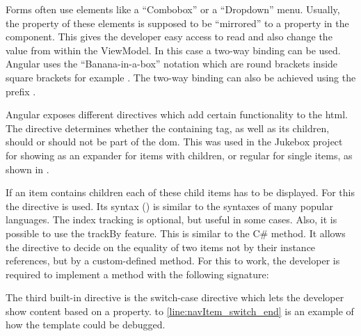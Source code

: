 Forms often use elements like a \enquote{Combobox} or a \enquote{Dropdown} menu. Usually, the  property of these elements is supposed to be \enquote{mirrored} to a property in the component. This gives the developer easy access to read and also change the value from within the ViewModel. In this case a two-way binding can be used. Angular uses the \enquote{Banana-in-a-box} notation which are round brackets inside square brackets for example . The two-way binding can also be achieved using the  prefix \zB {}. \cite{angularTemplateSyntax}


Angular exposes different directives which add certain functionality to the \gls{html}. The  directive determines whether the containing tag, as well as its children, should or should not be part of the \gls{dom}. This was used in the Jukebox project for showing  as an expander for items with children, or regular for single items, as shown in .

If an item contains children each of these child items has to be displayed. For this the  directive is used. Its syntax () is similar to the  syntaxes of many popular languages. The index tracking is optional, but useful in some cases. Also, it is possible to use the trackBy feature. This is similar to the  C\# method. It allows the  directive to decide on the equality of two items not by their instance references, but by a custom-defined method. For this to work, the developer is required to implement a method with the following signature:\\
\hspace*{1cm} 

The third built-in directive is the switch-case directive which lets the developer show content based on a property.  to \ref{line:navItem_switch_end} is an example of how the  template could be debugged.


